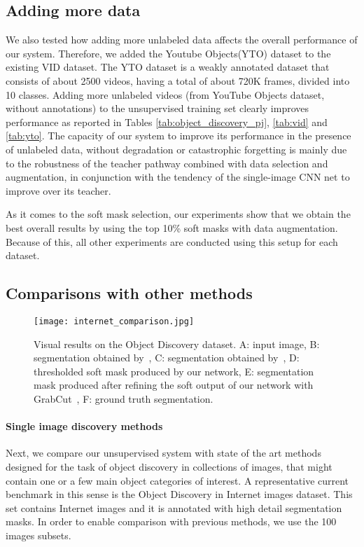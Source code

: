 \documentclass[10pt,twocolumn,letterpaper]{article}
\begin{document}
\subsection{Adding more data}
\label{sec:more_data}

We also tested how adding more unlabeled data 
affects the overall performance of our system. 
Therefore, we added 
the Youtube Objects(YTO) dataset
to the existing VID dataset. 
The YTO dataset
is a weakly annotated dataset that consists of about 2500 videos, having
a total of about 720K frames, divided into 10 classes.
Adding more unlabeled videos (from YouTube Objects dataset, without annotations) to the unsupervised training set clearly improves performance as reported in Tables \ref{tab:object_discovery_pj},
\ref{tab:vid} and \ref{tab:yto}. The capacity of our system to improve its performance in the presence of unlabeled data, without degradation or catastrophic forgetting is mainly due to the robustness of the teacher pathway combined with data selection and augmentation, in conjunction with the tendency of the single-image CNN net to improve over its teacher.

As it comes to the soft mask selection, our experiments show that we obtain the best overall results by using the top 10\% soft masks with data augmentation. Because of this, all other experiments are conducted using this setup for each dataset.



\subsection{Comparisons with other methods}
\label{sec:comparisons}

\begin{figure*}
\begin{center}
   \texttt{[image: internet\_comparison.jpg]}
\end{center}
   \caption{Visual results on the Object Discovery dataset. A: input image, B: segmentation obtained by~\cite{joulin2012multi}, C: segmentation obtained by~\cite{rubinstein2013unsupervised}, D: thresholded soft mask produced by our network, E: segmentation mask produced after refining the soft output of our network with GrabCut~\cite{rother2004grabcut}, F: ground truth segmentation. }
\label{fig:internet_visual}
\end{figure*}

\paragraph{Single image discovery methods}
Next, we compare our unsupervised system with state of the art methods designed for the task of object discovery in collections of images, that might contain one or a few main object categories of interest. A representative current benchmark in this sense is the Object Discovery in Internet images dataset. This set contains Internet images and it is annotated with high detail segmentation masks. In order to enable comparison with previous methods, we use the 100 images subsets.
\end{document}
